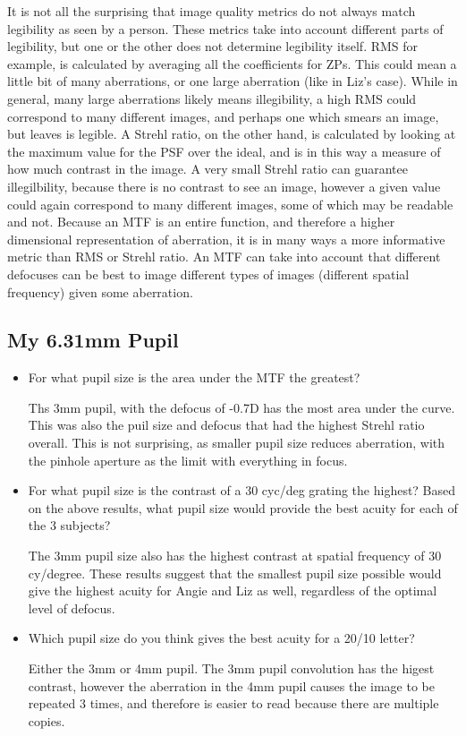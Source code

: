 \documentclass{article}
\begin{document}
\begin{itemize}
It is not all the surprising that image quality metrics do not always match legibility as seen by a person. These metrics take into account different parts of legibility, but one or the other does not determine legibility itself. RMS for example, is calculated by averaging all the coefficients for ZPs. This could mean a little bit of many aberrations, or one large aberration (like in Liz's case). While in general, many large aberrations likely means illegibility, a high RMS could correspond to many different images, and perhaps one which smears an image, but leaves is legible. A Strehl ratio, on the other hand, is calculated by looking at the maximum value for the PSF over the ideal, and is in this way a measure of how much contrast in the image. A very small Strehl ratio can guarantee illegilbility, because there is no contrast to see an image, however a given value could again correspond to many different images, some of which may be readable and not. Because an MTF is an entire function, and therefore a higher dimensional representation of aberration, it is in many ways a more informative metric than RMS or Strehl ratio. An MTF can take into account that different defocuses can be best to image different types of images (different spatial frequency) given some aberration.

\end{itemize}

\subsection{My 6.31mm Pupil}

\begin{itemize}
\item For what pupil size is the area under the MTF the greatest?

Ths 3mm pupil, with the defocus of -0.7D has the most area under the curve. This was also the puil size and defocus that had the highest Strehl ratio overall. This is not surprising, as smaller pupil size reduces aberration, with the pinhole aperture as the limit with everything in focus.

\item For what pupil size is the contrast of a 30 cyc/deg grating the highest? Based on the above results, what pupil size would provide the best acuity for each of the 3 subjects?

The 3mm pupil size also has the highest contrast at spatial frequency of 30 cy/degree. These results suggest that the smallest pupil size possible would give the highest acuity for Angie and Liz as well, regardless of the optimal level of defocus.

\item Which pupil size do you think gives the best acuity for a 20/10 letter?

Either the 3mm or 4mm pupil. The 3mm pupil convolution has the higest contrast, however the aberration in the 4mm pupil causes the image to be repeated 3 times, and therefore is easier to read because there are multiple copies.

\end{itemize}
\end{document}
